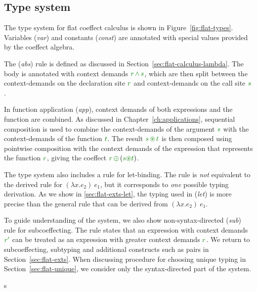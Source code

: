 
\subsection{Type system}
\label{sec:flat-calculus-types}

The type system for flat coeffect calculus is shown in Figure~\ref{fig:flat-types}. Variables
(\emph{var}) and constants (\emph{const}) are annotated with special values provided by the
coeffect algebra.

The (\emph{abs}) rule is defined as discussed in Section~\ref{sec:flat-calculus-lambda}. The
body is annotated with context demands $\cclrd{r} \,\czip\, \cclrd{s}$, which are then split
between the context-demands on the declaration site $\cclrd{r}$ and context-demands on
the call site $\cclrd{s}$.

In function application (\emph{app}), context demands of both expressions and the
function are combined. As discussed in Chapter~\ref{ch:applications}, sequential composition
is used to combine the context-demands of the argument $\cclrd{s}$ with the context-demands
of the function $\cclrd{t}$. The result $\cclrd{s}\,\cseq\,\cclrd{t}$ is then composed using
pointwise composition with the context demands of the expression that represents the function
$\cclrd{r}$, giving the coeffect $\cclrd{r}\,\cpar\,(\cclrd{s}\cseq\cclrd{t})$.

The type system also includes a rule for let-binding. The rule is \emph{not} equivalent to the
derived rule for $(\lambda x.e_2)~e_1$, but it corresponds to \emph{one} possible typing
derivation. As we show in \ref{sec:flat-exts-let}, the typing used in (\emph{let}) is more
precise than the general rule that can be derived from $(\lambda x.e_2)~e_1$.

To guide understanding of the system, we also show non-syntax-directed (\emph{sub}) rule for
subcoeffecting. The rule states that an expression with context demands $\cclrd{r'}$ can be
treated as an expression with greater context demands $\cclrd{r}$. We return to subcoeffecting,
subtyping and additional constructs such as pairs in Section~\ref{sec:flat-exts}. When
discussing procedure for choosing unique typing in Section~\ref{sec:flat-unique}, we consider
only the syntax-directed part of the system.

s
